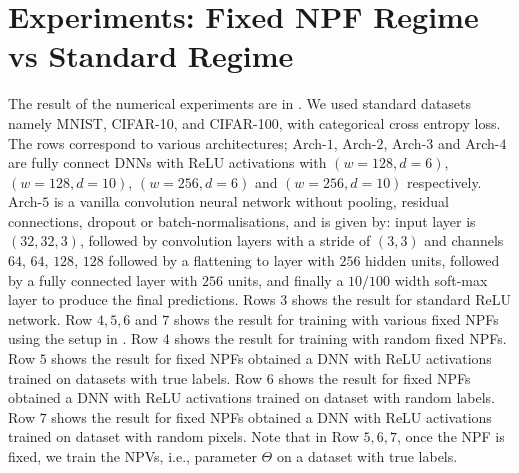 \section{Experiments: Fixed NPF Regime vs  Standard Regime}\label{sec:generalisation}
The result of the numerical experiments are in . We used standard datasets namely MNIST, CIFAR-10, and CIFAR-100, with categorical cross entropy loss. The rows correspond to various architectures; Arch-$1$, Arch-$2$, Arch-$3$ and Arch-$4$ are fully connect DNNs with ReLU activations with $(w=128,d=6)$, $(w=128,d=10)$, $(w=256,d=6)$ and $(w=256,d=10)$ respectively. Arch-$5$ is a vanilla convolution neural network without pooling, residual connections, dropout or batch-normalisations, and is given by: input layer is $(32, 32, 3)$, followed by convolution layers with a stride of $(3, 3)$ and channels $64$, $64$, $128$, $128$ followed by a flattening to layer with $256$ hidden units, followed by a fully connected layer with $256$ units, and finally a  $10/100$ width soft-max layer to produce the final predictions. Rows $3$ shows the result for standard ReLU network. Row $4,5,6$ and $7$ shows the result for training with various fixed NPFs using the setup in . Row $4$ shows the result for training with random fixed NPFs. Row $5$ shows the result for fixed NPFs obtained a DNN with ReLU activations trained on datasets with true labels. Row $6$ shows the result for fixed NPFs obtained a DNN with ReLU activations trained on dataset with random labels. Row $7$ shows the result for fixed NPFs obtained a DNN with ReLU activations trained on dataset with random pixels. Note that in Row $5,6,7$, once the NPF is fixed, we train the NPVs, i.e., parameter $\Theta$ on a dataset with true labels.
